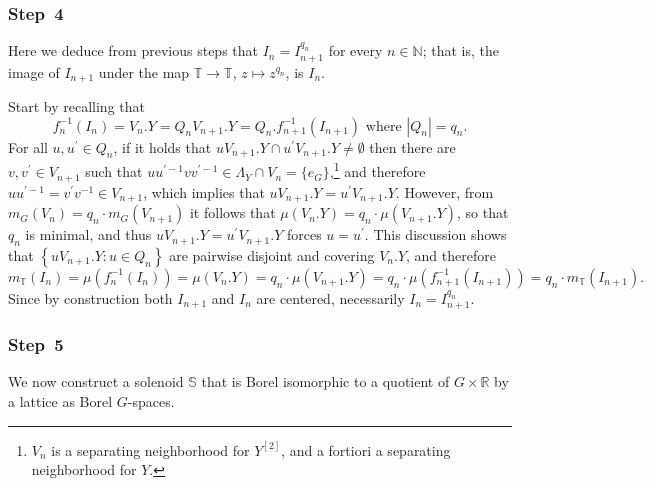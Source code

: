 \documentclass{amsart}
\numberwithin{equation}{subsection}
\theoremstyle{remark}
\begin{document}
\subsubsection*{\textbf{Step~4}}

Here we deduce from previous steps that \(I_{n}=I_{n+1}^{q_{n}}\) for every \(n\in\mathbb{N}\); that is, the image of \(I_{n+1}\) under the map \(\mathbb{T}\to\mathbb{T}\), \(z\mapsto z^{q_{n}}\), is \(I_{n}\).

\smallskip

Start by recalling that
\[f_{n}^{-1}\left(I_{n}\right)=V_{n}.Y=Q_{n}V_{n+1}.Y=Q_{n}.f_{n+1}^{-1}\left(I_{n+1}\right)\text{ where }\left|Q_{n}\right|=q_{n}.\]
For all \(u,u^{\prime}\in Q_{n}\), if it holds that \(uV_{n+1}.Y\cap u^{\prime}V_{n+1}.Y\neq\emptyset\) then there are \(v,v^{\prime}\in V_{n+1}\) such that \(uu^{\prime -1}vv^{\prime -1}\in\Lambda_{Y}\cap V_{n}=\{e_{G}\}\),\footnote{\(V_{n}\) is a separating neighborhood for \(Y^{\left[2\right]}\), and a fortiori a separating neighborhood for \(Y\).} and therefore \(uu^{\prime -1}=v^{\prime}v^{-1}\in V_{n+1}\), which implies that \(uV_{n+1}.Y=u^{\prime}V_{n+1}.Y\). However, from \(m_{G}\left(V_{n}\right)=q_{n}\cdot m_{G}\left(V_{n+1}\right)\) it follows that \(\mu\left(V_{n}.Y\right)=q_{n}\cdot\mu\left(V_{n+1}.Y\right)\), so that \(q_{n}\) is minimal, and thus \(uV_{n+1}.Y=u^{\prime}V_{n+1}.Y\) forces \(u=u^{\prime}\). This discussion shows that \(\left\{uV_{n+1}.Y:u\in Q_{n}\right\}\) are pairwise disjoint and covering \(V_{n}.Y\), and therefore
\[m_{\mathbb{T}}\left(I_{n}\right)=\mu\left(f_{n}^{-1}\left(I_{n}\right)\right)=\mu\left(V_{n}.Y\right)=q_{n}\cdot\mu\left(V_{n+1}.Y\right)=q_{n}\cdot\mu\left(f_{n+1}^{-1}\left(I_{n+1}\right)\right)=q_{n}\cdot m_{\mathbb{T}}\left(I_{n+1}\right).\]
Since by construction both \(I_{n+1}\) and \(I_{n}\) are centered, necessarily \(I_{n}=I_{n+1}^{q_{n}}\).

\subsubsection*{\textbf{Step~5}}

We now construct a solenoid \(\mathbb{S}\) that is Borel isomorphic to a quotient of \(G\times\mathbb{R}\) by a lattice as Borel \(G\)-spaces.

\smallskip
\end{document}
